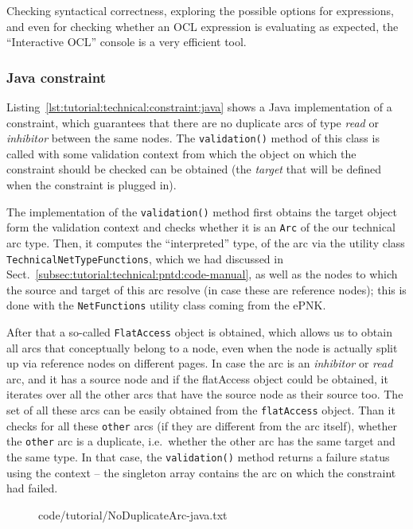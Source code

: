Checking syntactical correctness, exploring the possible options for
expressions, and even for checking whether an OCL expression is evaluating as
expected, the ``Interactive OCL'' console is a very efficient tool.

\subsubsection{Java constraint}
\label{subsubsec:tutorial:technical:constraints:java}

Listing~\ref{lst:tutorial:technical:constraint:java} shows a Java implementation
of a constraint, which guarantees that there are no duplicate arcs of type
\emph{read} or \emph{inhibitor} between the same nodes. The {\tt validation()}
method of this class is called with some validation context from which the object on which the constraint
should be checked can be obtained (the \emph{target} that will be defined when
the constraint is plugged in). 

The implementation of the {\tt validation()} method first obtains the target
object form the validation context and checks whether it is an {\tt Arc} of
the our technical arc type. Then, it computes the ``interpreted'' type,
of the arc via the utility class {\tt TechnicalNetTypeFunctions}, which
we had discussed in Sect.~\ref{subsec:tutorial:technical:pntd:code-manual},
as well as the nodes to which the source and target of this arc resolve (in
case these are reference nodes); this is done with the {\tt NetFunctions}
utility class coming from the ePNK.

After that a so-called {\tt FlatAccess} object is obtained, which allows us to
obtain all arcs that conceptually belong to a node, even when the node is actually
split up via reference nodes on different pages. In case the arc is an
\emph{inhibitor} or \emph{read} arc, and it has a source node and if the
flatAccess object could be obtained, it iterates over all the other arcs that
have the source node as their source too. The set of all these arcs can be
easily obtained from the {\tt flatAccess} object. Than it checks for all
these {\tt other} arcs (if they are different from the arc itself), whether
the  {\tt other} arc is a duplicate, i.e.\ whether the other arc has the same
target and the same type. In that case, the {\tt validation()} method returns
a failure status using the context -- the singleton array contains the arc
on which the constraint had failed.

\begin{figure}[htbp!]
%
  {code/tutorial/NoDuplicateArc-java.txt}
\end{figure}

